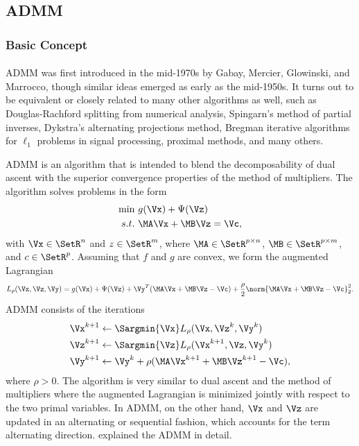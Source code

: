 \documentclass[
10pt, %
a4paper, %
oneside, %
headinclude,footinclude, %
BCOR5mm, %
]{scrartcl}
\begin{document}
\subsection{ADMM}
\subsubsection{Basic Concept}
\paragraph{}
ADMM was first introduced in the mid-1970s by Gabay, Mercier, Glowinski, and 
Marrocco, though similar ideas emerged as early as the mid-1950s. It turns out 
to be equivalent or closely related to many other algorithms as well, such as 
Douglas-Rachford splitting from numerical analysis, Spingarn's method of partial 
inverses, Dykstra's alternating projections method, Bregman iterative algorithms 
for $\ell_1$ problems in signal processing, proximal methods, and many others.

ADMM is an algorithm that is intended to blend the decomposability of dual 
ascent with the superior convergence properties of the method of multipliers. 
The algorithm solves problems in the form
\begin{equation}
	\begin{split}
    \min~& g(\Vx) + \Psi(\Vz) \\
	s.t.~& \MA \Vx + \MB \Vz = \Vc,
	\end{split}
\end{equation}
with $\Vx \in \SetR^n$ and $z \in \SetR^m$, where $ \MA \in \SetR^{p \times n} 
$, $\MB \in \SetR^{p \times m}$, and $c \in \SetR^p$. Assuming that $f$ and $g$ 
are convex, we form the augmented Lagrangian 
\begin{equation*}
L_\rho(\Vx, \Vz, \Vy) = g(\Vx) + \Psi(\Vz) + \Vy^T(\MA\Vx + \MB \Vz - \Vc) + 
\frac{\rho}{2} \norm{\MA\Vx + \MB\Vz - \Vc}_2^2.
\end{equation*}
ADMM consists of the iterations
\begin{align}
	\Vx^{k+1}& \gets \Sargmin{\Vx} L_\rho(\Vx, \Vz^k, \Vy^k) \nonumber \\
	\Vz^{k+1}& \gets \Sargmin{\Vz} L_\rho(\Vx^{k+1}, \Vz, \Vy^k) \nonumber \\
	\Vy^{k+1}& \gets \Vy^k + \rho (\MA \Vx^{k+1} + \MB \Vz^{k+1} - \Vc), 
\nonumber
\end{align}
where $\rho > 0$. The algorithm is very similar to dual ascent and the method of 
multipliers where the augmented Lagrangian is minimized jointly with respect to 
the two primal variables. In ADMM, on the other hand, $\Vx$ and $\Vz$ are 
updated in an alternating or sequential fashion, which accounts for the term 
alternating direction. \citet{boyd2011distributed} explained the ADMM in 
detail.
\end{document}
